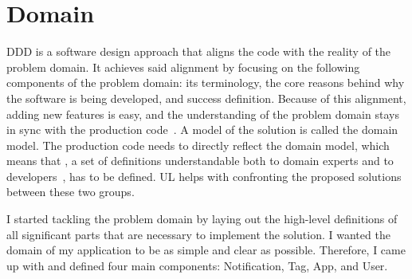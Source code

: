 \section{Domain}\label{sec:domain}

\Ac{DDD} is a software design approach
that aligns the code with the reality
of the problem domain.
It achieves said alignment by focusing
on the following components of the problem domain:
its terminology,
the core reasons behind why the software is being developed,
and success definition.
Because of this alignment,
adding new features is easy,
and the understanding of the problem domain
stays in sync with the production code~\cite{millett_patterns_2015}.
A model of the solution is called the domain model.
The production code needs to directly reflect the domain model,
which means that , a set of definitions
understandable both to domain experts
and to developers~\cite{evans_domain-driven_2003,millett_patterns_2015},
has to be defined.
\Ac{UL} helps with confronting the proposed solutions
between these two groups.

I started tackling the problem domain by
laying out the high-level definitions
of all significant parts
that are necessary to implement the solution.
I wanted the domain of my application
to be as simple and clear as possible.
Therefore,
I came up with 
and defined four main components: Notification, Tag, App, and User.






